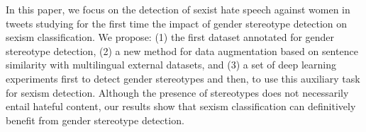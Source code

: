 In this paper, we focus on the detection of sexist hate speech against women in tweets studying for the first time the impact of gender stereotype detection on sexism classification. We propose: (1) the first dataset  annotated for gender stereotype detection, (2) a new method for data augmentation based on sentence similarity with multilingual external datasets, and (3) a set of deep learning experiments first to detect gender stereotypes and then, to use this auxiliary task for sexism detection. Although the presence of stereotypes does not necessarily entail hateful content, our results show that sexism classification can definitively benefit from gender stereotype detection.
